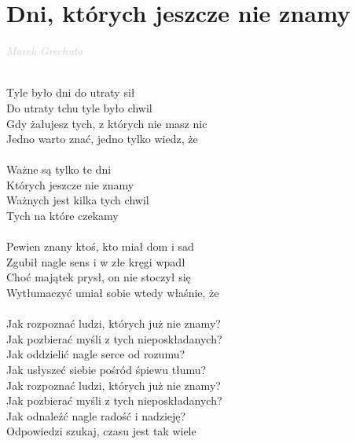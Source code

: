 \documentclass[a5paper, 10pt]{book}
\begin{document}
\section{Dni, których jeszcze nie znamy}\textcolor{lightgray}{\textit{Marek Grechuta}}\\~\\
\begin{minipage}[t]{0.7\textwidth}
  Tyle było dni do utraty sił\\
  Do utraty tchu tyle było chwil\\
  Gdy żałujesz tych, z których nie masz nic\\
  Jedno warto znać, jedno tylko wiedz, że\\
  \\
  \hspace*{10mm}Ważne są tylko te dni\\
  \hspace*{10mm}Których jeszcze nie znamy\\
  \hspace*{10mm}Ważnych jest kilka tych chwil\\
  \hspace*{10mm}Tych na które czekamy\\
  \\
  Pewien znany ktoś, kto miał dom i sad\\
  Zgubił nagle sens i w złe kręgi wpadł\\
  Choć majątek prysł, on nie stoczył się\\
  Wytłumaczyć umiał sobie wtedy właśnie, że\\
  \\
  \hspace*{5mm}Jak rozpoznać ludzi, których już nie znamy?\\
  \hspace*{5mm}Jak pozbierać myśli z tych nieposkładanych?\\
  \hspace*{5mm}Jak oddzielić nagle serce od rozumu?\\
  \hspace*{5mm}Jak usłyszeć siebie pośród śpiewu tłumu?\vspace*{2mm}
  \\
  \hspace*{5mm}Jak rozpoznać ludzi, których już nie znamy?\\
  \hspace*{5mm}Jak pozbierać myśli z tych nieposkładanych?\\
  \hspace*{5mm}Jak odnaleźć nagle radość i nadzieję?\\
  \hspace*{5mm}Odpowiedzi szukaj, czasu jest tak wiele\\

\end{minipage}
\end{document}
